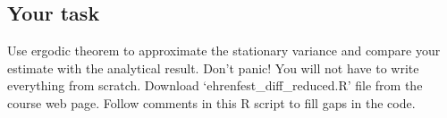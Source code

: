 \documentclass[11pt]{article}
\numberwithin{algorithm}{section}
\theoremstyle{remark}
\theoremstyle{definition}
\numberwithin{equation}{section}
\numberwithin{figure}{section}
\begin{document}
\subsection*{Your task}
Use ergodic theorem to approximate the stationary variance and compare your estimate with the analytical result.
Don't panic! You will not have to write everything from scratch. Download `ehrenfest\_diff\_reduced.R' file from the course
web page. Follow comments in this R script to fill gaps in the code. 
\end{document}
